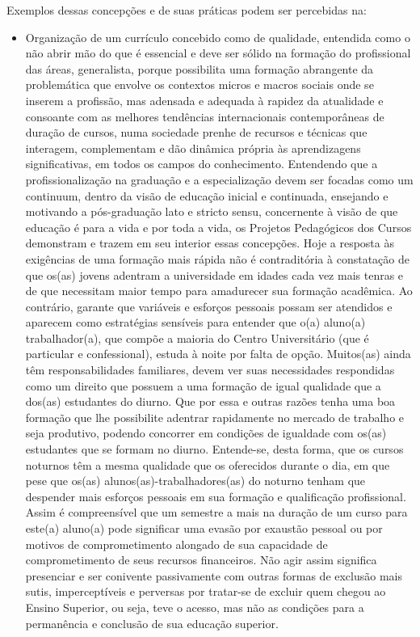 \documentclass[a4paper, 12pt, openright, oneside, german, french, english, brazil]{abntex2}
\begin{document}
Exemplos dessas concepções e de suas práticas podem ser percebidas na:

\begin{itemize}
\item Organização de um currículo concebido como de qualidade, entendida como o não abrir mão do que é essencial e deve ser sólido na formação do profissional das áreas, generalista, porque possibilita uma formação abrangente da problemática que envolve os contextos micros e macros sociais onde se inserem a profissão, mas adensada e adequada à rapidez da atualidade e consoante com as melhores tendências internacionais contemporâneas de duração de cursos, numa sociedade prenhe de recursos e técnicas que interagem, complementam e dão dinâmica própria às aprendizagens significativas, em todos os campos do conhecimento. Entendendo que a profissionalização na graduação e a especialização devem ser focadas como um continuum, dentro da visão de educação inicial e continuada, ensejando e motivando a pós-graduação lato e stricto sensu, concernente à visão de que educação é para a vida e por toda a vida, os Projetos Pedagógicos dos Cursos demonstram e trazem em seu interior essas concepções. Hoje a resposta às exigências de uma formação mais rápida não é contraditória à constatação de que os(as) jovens adentram a universidade em idades cada vez mais tenras e de que necessitam maior tempo para amadurecer sua formação acadêmica. Ao contrário, garante que variáveis e esforços pessoais possam ser atendidos e aparecem como estratégias sensíveis para entender que o(a) aluno(a) trabalhador(a), que compõe a maioria do Centro Universitário (que é particular e confessional), estuda à noite por falta de opção. Muitos(as) ainda têm responsabilidades familiares, devem ver suas necessidades respondidas como um direito que possuem a uma formação de igual qualidade que a dos(as) estudantes do diurno. Que por essa e outras razões tenha uma boa formação que lhe possibilite adentrar rapidamente no mercado de trabalho e seja produtivo, podendo concorrer em condições de igualdade com os(as) estudantes que se formam no diurno. Entende-se, desta forma, que os cursos noturnos têm a mesma qualidade que os oferecidos durante o dia, em que pese que os(as) alunos(as)-trabalhadores(as) do noturno tenham que despender mais esforços pessoais em sua formação e qualificação profissional. Assim é compreensível que um semestre a mais na duração de um curso para este(a) aluno(a) pode significar uma evasão por exaustão pessoal ou por motivos de comprometimento alongado de sua capacidade de comprometimento de seus recursos financeiros. Não agir assim significa presenciar e ser conivente passivamente com outras formas de exclusão mais sutis, imperceptíveis e perversas por tratar-se de excluir quem chegou ao Ensino Superior, ou seja, teve o acesso, mas não as condições para a permanência e conclusão de sua educação superior.


\end{itemize}
\end{document}

